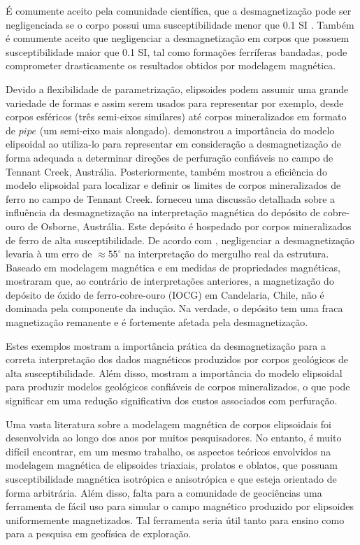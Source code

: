 É comumente aceito pela comunidade científica, que a desmagnetização pode ser 
negligenciada se o corpo possui uma susceptibilidade menor que 0.1 SI
\citep{austin2014, clark2014, clark1986, emerson1985, eskola1980, guo1998, guo2001, purss2005, hillan2013}.
Também é comumente aceito que negligenciar a desmagnetização em corpos que possuem 
susceptibilidade maior que 0.1 SI, tal como formações ferríferas bandadas, pode comprometer drasticamente
os resultados obtidos por modelagem magnética.

Devido a flexibilidade  de parametrização, elipsoides podem assumir uma grande variedade de formas e assim serem 
usados para representar por exemplo, desde corpos esféricos (três semi-eixos similares) até corpos mineralizados em formato de $pipe$ (um semi-eixo mais alongado).
\citet{farrar1979} demonstrou a importância do modelo elipsoidal ao utiliza-lo para representar
em consideração a desmagnetização de forma adequada a determinar direções de 
perfuração confiáveis no campo de Tennant Creek, Austrália.
Posteriormente, \citet{hoschke1991} também mostrou a eficiência do
modelo elipsoidal para localizar e definir os limites de corpos mineralizados de ferro no campo de Tennant Creek.
\citet{clark2000} forneceu uma discussão detalhada sobre a influência da desmagnetização na interpretação magnética do depósito de cobre-ouro de Osborne, Austrália. Este depósito é hospedado por corpos mineralizados de ferro de alta susceptibilidade. De acordo com \citet{clark2000}, negligenciar a desmagnetização levaria à um erro de $\approx 55^{\circ}$ na interpretação do mergulho real da estrutura.
Baseado em modelagem magnética e em medidas de propriedades magnéticas, \citet{austin2014} mostraram que, ao contrário de interpretações anteriores, a magnetização do depósito de óxido de ferro-cobre-ouro (IOCG) em Candelaria, Chile, não é dominada pela componente da indução. Na verdade, o depósito tem uma fraca magnetização remanente e é fortemente afetada pela desmagnetização.

Estes exemplos mostram a importância prática da desmagnetização para a correta interpretação dos dados magnéticos produzidos por corpos geológicos de alta susceptibilidade.
Além disso, mostram a importância do modelo elipsoidal para produzir modelos geológicos confiáveis de corpos mineralizados, o que pode significar em uma redução significativa dos custos associados com perfuração.

Uma vasta literatura sobre a modelagem magnética de corpos elipsoidais foi desenvolvida ao longo dos anos por muitos pesquisadores. No entanto, é muito difícil encontrar, em um mesmo trabalho, os aspectos teóricos envolvidos na modelagem magnética de elipsoides triaxiais, prolatos e oblatos, que possuam susceptibilidade magnética isotrópica e anisotrópica e que esteja orientado de forma arbitrária. Além disso, falta para a comunidade de geociências uma ferramenta de fácil uso para simular o campo magnético produzido por elipsoides uniformemente magnetizados. Tal ferramenta seria útil tanto para ensino como para a pesquisa em geofísica de exploração. 

